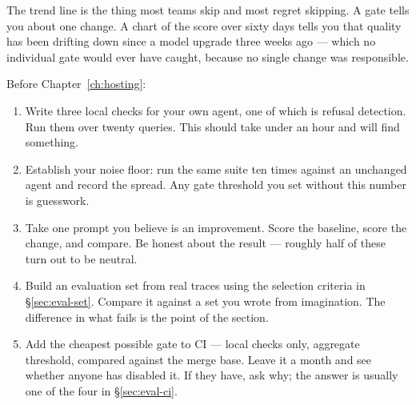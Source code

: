 \begin{note}
The trend line is the thing most teams skip and most regret skipping. A gate
tells you about one change. A chart of the score over sixty days tells you that
quality has been drifting down since a model upgrade three weeks ago --- which no
individual gate would ever have caught, because no single change was responsible.
\end{note}


\begin{exercisebox}
Before Chapter~\ref{ch:hosting}:

\begin{enumerate}[leftmargin=1.4em]
\item Write three local checks for your own agent, one of which is refusal
      detection. Run them over twenty queries. This should take under an hour and
      will find something.
\item Establish your noise floor: run the same suite ten times against an
      unchanged agent and record the spread. Any gate threshold you set without
      this number is guesswork.
\item Take one prompt you believe is an improvement. Score the baseline, score
      the change, and compare. Be honest about the result --- roughly half of
      these turn out to be neutral.
\item Build an evaluation set from real traces using the selection criteria in
      \S\ref{sec:eval-set}. Compare it against a set you wrote from
      imagination. The difference in what fails is the point of the section.
\item Add the cheapest possible gate to CI --- local checks only, aggregate
      threshold, compared against the merge base. Leave it a month and see
      whether anyone has disabled it. If they have, ask why; the answer is
      usually one of the four in \S\ref{sec:eval-ci}.
\end{enumerate}
\end{exercisebox}

